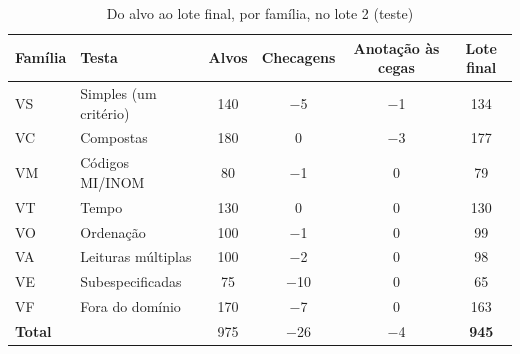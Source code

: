 \begin{table}[htbp!]
\centering
\caption{Do alvo ao lote final, por família, no lote 2 (teste)}
\label{tab:lote2_composicao}
\footnotesize
\begin{tabular}{|l|l|c|c|c|c|}
\hline
\textbf{Família} & \textbf{Testa} & \textbf{Alvos} & \textbf{Checagens} & \textbf{Anotação às cegas} & \textbf{Lote final} \\
\hline
VS & Simples (um critério) & 140 & $-$5 & $-$1 & 134 \\
VC & Compostas & 180 & 0 & $-$3 & 177 \\
VM & Códigos MI/INOM & 80 & $-$1 & 0 & 79 \\
VT & Tempo & 130 & 0 & 0 & 130 \\
VO & Ordenação & 100 & $-$1 & 0 & 99 \\
VA & Leituras múltiplas & 100 & $-$2 & 0 & 98 \\
VE & Subespecificadas & 75 & $-$10 & 0 & 65 \\
VF & Fora do domínio & 170 & $-$7 & 0 & 163 \\
\hline
\textbf{Total} & & 975 & $-$26 & $-$4 & \textbf{945} \\
\hline
\end{tabular}
\end{table}
